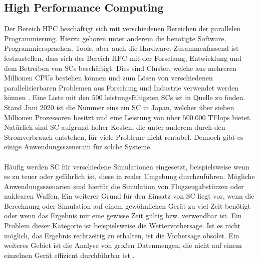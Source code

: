 \subsection{High Performance Computing}
Der Bereich \ac{HPC} beschäftigt sich mit verschiedenen Bereichen der parallelen Programmierung. Hierzu gehören unter anderem die benötigte Software, Programmiersprachen, Tools, aber auch die Hardware. Zusammenfassend ist festzustellen, dass sich der Bereich \ac{HPC} mit der Forschung, Entwicklung und dem Betreiben von \acp{SC} beschäftigt. Dies sind Cluster, welche aus mehreren Millionen \acp{CPU} bestehen können und zum Lösen von verschiedenen parallelisierbaren Problemen aus Forschung und Industrie verwendet werden können \cite{nielsen2016introduction}. Eine Liste mit den $500$ leistungsfähigsten \acp{SC} ist in Quelle \cite{top500} zu finden. Stand Juni 2020 ist die Nummer eins ein \ac{SC} in Japan, welcher über sieben Millionen Prozessoren besitzt und eine Leistung von über $500.000$ TFlops bietet. Natürlich sind \ac{SC} aufgrund hoher Kosten, die unter anderem durch den Stromverbrauch entstehen, für viele Probleme nicht rentabel. Dennoch gibt es einige Anwendungsszenerain für solche Systeme.
\\\\
Häufig werden \ac{SC} für verschiedene Simulationen eingesetzt, beispielsweise wenn es zu teuer oder gefährlich ist, diese in realer Umgebung durchzuführen. Mögliche Anwendungsszenarien sind hierfür die Simulation von Flugzeugabstürzen oder nuklearen Waffen. Ein weiterer Grund für den Einsatz von SC liegt vor, wenn die Berechnung oder Simulation auf einem gewöhnlichen Gerät zu viel Zeit benötigt oder wenn das Ergebnis nur eine gewisse Zeit gültig bzw. verwendbar ist. Ein Problem dieser Kategorie ist beispielsweise die Wettervorhersage. Ist es nicht möglich, das Ergebnis rechtzeitig zu erhalten, ist die Vorhersage obsolet. Ein weiteres Gebiet ist die Analyse von großen Datenmengen, die nicht auf einem einzelnen Gerät effizient durchführbar ist \cite{nielsen2016introduction}.

